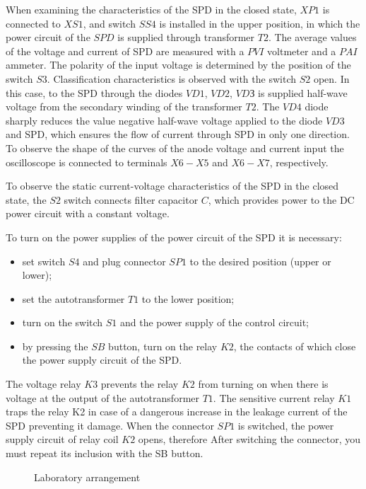 \documentclass[a4paper,14pt]{article}
\begin{document}
When examining the characteristics of the SPD in the closed state, $XP1$ is connected to $XS1$, and switch $SS4$
is installed in the upper position, in which the power circuit of the $SPD$ is supplied  through
transformer $T2$. 
The average values of the voltage and current of SPD are measured with a $PVI$ voltmeter and a $PAI$ ammeter.
The polarity of the input voltage is determined by the position of the switch $S3$. 
Classification characteristics is observed with the switch $S2$ open. 
In this case, to the SPD through the diodes $VD1$, $VD2$, $VDЗ$ is supplied
half-wave voltage from the secondary winding of the transformer $T2$. 
The $VD4$ diode sharply reduces the value
negative half-wave voltage applied to the diode $VD3$ and SPD, which ensures the flow of current
through SPD in only one direction. To observe the shape of the curves of the anode voltage and current input
the oscilloscope is connected to terminals $X6-X5$ and $X6-X7$, respectively.

To observe the static current-voltage characteristics of the SPD in the closed state, the $S2$ switch connects
filter capacitor $C$, which provides power to the DC power circuit with a constant voltage.

To turn on the power supplies of the power circuit of the SPD it is necessary:

\begin{itemize}
\item set switch $S4$ and plug connector $SP1$ to the desired position (upper or lower);
\item set the autotransformer $T1$ to the lower position;
\item turn on the switch $S1$ and the power supply of the control circuit;
\item by pressing the $SB$ button, turn on the relay $K2$, 
the contacts of which close the power supply circuit of the SPD.
\end{itemize}

The voltage relay $K3$ prevents the relay $K2$ from turning on when there is voltage at the output 
of the autotransformer $T1$.
The sensitive current relay $K1$ traps the relay K2 in case of a dangerous increase in the leakage current 
of the SPD preventing it damage. When the connector $SP1$ is switched, 
the power supply circuit of relay coil $K2$ opens, therefore
After switching the connector, you must repeat its inclusion with the SB button.

\begin{landscape}
        \hspace{-3cm}
        \vspace{1cm}
\begin{figure}[ht!] 
 
\caption{Laboratory arrangement}
\label{labsetup}
\end{figure}
\end{landscape}
\end{document}
